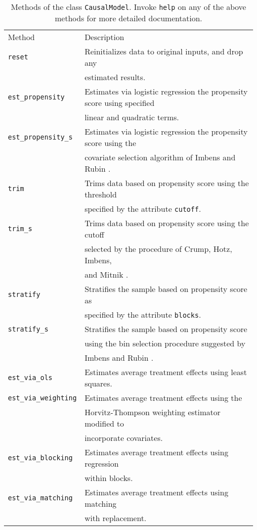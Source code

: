 \documentclass[12pt]{article}
\theoremstyle{definition}
\theoremstyle{definition}
\theoremstyle{definition}
\theoremstyle{remark}
\begin{document}
\begin{table}[ht]
\begin{center}\begin{tabular}{ll}
Method & Description \\
\texttt{reset} & Reinitializes data to original inputs, and drop any \\
& estimated results. \\
\texttt{est\_propensity} & Estimates via logistic regression the propensity score using specified \\
& linear and quadratic terms. \\
\texttt{est\_propensity\_s} & Estimates via logistic regression the propensity score using the \\
& covariate selection algorithm of Imbens and Rubin \citeyear{ImbensRubin.2015}. \\
\texttt{trim} & Trims data based on propensity score using the threshold \\
& specified by the attribute \texttt{cutoff}. \\
\texttt{trim\_s} & Trims data based on propensity score using the cutoff \\
& selected by the procedure of Crump, Hotz, Imbens, \\
& and Mitnik \citeyear{CrumpHotzImbensMitnik.2009}. \\
\texttt{stratify} & Stratifies the sample based on propensity score as \\
& specified by the attribute \texttt{blocks}. \\
\texttt{stratify\_s} & Stratifies the sample based on propensity score \\
& using the bin selection procedure suggested by \\
& Imbens and Rubin \citeyear{ImbensRubin.2015}. \\
\texttt{est\_via\_ols} & Estimates average treatment effects using least squares. \\
\texttt{est\_via\_weighting} & Estimates average treatment effects using the \\
& Horvitz-Thompson weighting estimator modified to \\
& incorporate covariates. \\
\texttt{est\_via\_blocking} & Estimates average treatment effects using regression \\
& within blocks. \\
\texttt{est\_via\_matching} & Estimates average treatment effects using matching \\
& with replacement.
\end{tabular}\end{center}
\caption{Methods of the class \texttt{CausalModel}. Invoke \texttt{help} on any of the above methods for more detailed documentation.}  \label{tab.b}
\end{table}

\end{document}
